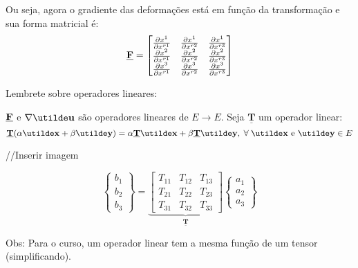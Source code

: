 Ou seja, agora o gradiente das deformações está em função da transformação e sua forma matricial é:
\[
	\underline{\mathbf{F}}=
	\begin{bmatrix}
		\frac{\partial x^1}{\partial x^{r1}} & \frac{\partial x^1}{\partial x^{r2}} & \frac{\partial x^1}{\partial x^{r3}} \\
		\frac{\partial x^2}{\partial x^{r1}} & \frac{\partial x^2}{\partial x^{r2}} & \frac{\partial x^2}{\partial x^{r3}} \\
		\frac{\partial x^3}{\partial x^{r1}} & \frac{\partial x^3}{\partial x^{r2}} & \frac{\partial x^3}{\partial x^{r3}}
	\end{bmatrix}	
\]
	
Lembrete sobre operadores lineares:
	
$\underline{\mathbf{F}}$ e $\nabla\vt{u}$  são operadores lineares de $E\rightarrow E$. Seja $\mathbf{\underline{T}}$ um operador linear:
\[\mathbf{\underline{T}}(\alpha\vt{x}+\beta\vt{y})=\alpha\mathbf{\underline{T}}\vt{x}+\beta\mathbf{\underline{T}}\vt{y},\;\forall\;\mathbf{\vt{x}}\text{ e }\mathbf{\vt{y}}\in\text{$E$}\]
	
//Inserir imagem
	
\[
	\begin{Bmatrix}
		b_1 \\ b_2 \\ b_3
	\end{Bmatrix}
	=
	\underbrace{
	\begin{bmatrix}
		T_{11} & T_{12} & T_{13} \\
		T_{21} & T_{22} & T_{23} \\
		T_{31} & T_{32} & T_{33}
	\end{bmatrix}
	}_{\displaystyle\mathbf{\underline{T}}}
	\begin{Bmatrix}
		a_1 \\ a_2 \\ a_3
	\end{Bmatrix}
\]
	
Obs: Para o curso, um operador linear tem a mesma função de um tensor (simplificando).